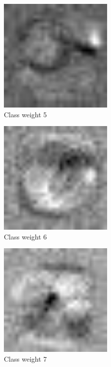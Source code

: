 \begin{figure}[]
    \centering
    \includegraphics[width=0.50\textwidth]{figures/weights/class_5_weight_image.jpg}
    \caption{Class weight 5}
    \label{fig:class_weight_5}
\end{figure}

\begin{figure}[]
    \centering
    \includegraphics[width=0.50\textwidth]{figures/weights/class_6_weight_image.jpg}
    \caption{Class weight 6}
    \label{fig:class_weight_6}
\end{figure}

\begin{figure}[]
    \centering
    \includegraphics[width=0.50\textwidth]{figures/weights/class_7_weight_image.jpg}
    \caption{Class weight 7}
    \label{fig:class_weight_7}
\end{figure}

